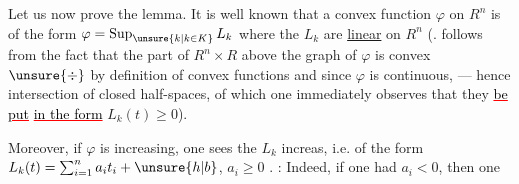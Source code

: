 Let us now prove the lemma. It is well known that a  convex function  $\varphi$ on $R^n$ is of the form $\varphi=\operatorname*{Sup}_{\unsure{k|k\in K}}L_k$ where the $L_k$ are  \uline{linear}  on $R^n$ (. follows from the fact that the part of $R^n\times R$ above the graph of $\varphi$ is convex $\unsure{\div}$ by definition of convex functions and  since $\varphi$ is continuous, --- hence intersection of closed half-spaces, of which one immediately observes
\reversemarginpar
{}
\normalmarginpar
that they  \textcolor{red}{\uline{\textcolor{black}{ be put}}} \textcolor{red}{\uline{\textcolor{black}{in the form}}}  $L_k(t)\geq0$).

Moreover, if $\varphi$ is increasing, one sees  the $L_k$ increas, i.e.  of the form $L_k(t)=\sum_{i=1}^n a_it_i+\unsure{h|b}$,  $a_i\geq0$ .  : Indeed, if one had $a_i<0$, then  one

\reversemarginpar
{}
\normalmarginpar
